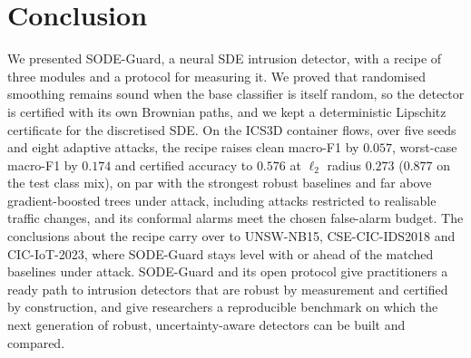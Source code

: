 \section{Conclusion}\label{sec:conc}
We presented SODE-Guard, a neural SDE intrusion detector, with a recipe of
three modules and a protocol for measuring it. We proved that randomised
smoothing remains sound when the base classifier is itself random, so the
detector is certified with its own Brownian paths, and we kept a deterministic
Lipschitz certificate for the discretised SDE. On the ICS3D container flows,
over five seeds and eight adaptive attacks, the recipe raises clean macro-F1 by $0.057$, worst-case
macro-F1 by $0.174$ and certified accuracy to $0.576$ at $\ell_2$ radius $0.273$
($0.877$ on the test class mix), on par with the strongest robust baselines and
far above gradient-boosted trees under attack, including attacks restricted to
realisable traffic changes, and its conformal alarms meet the chosen
false-alarm budget. The conclusions about the recipe carry over to UNSW-NB15,
CSE-CIC-IDS2018 and CIC-IoT-2023, where SODE-Guard stays level with or ahead of the matched
baselines under attack. SODE-Guard and its open protocol
give practitioners a ready path to intrusion detectors that are robust by
measurement and certified by construction, and give researchers a reproducible
benchmark on which the next generation of robust, uncertainty-aware detectors
can be built and compared.



